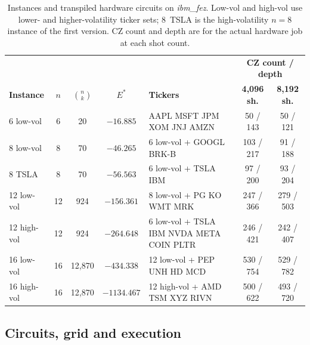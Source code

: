 \documentclass[conference]{IEEEtran}
\begin{document}
\begin{table}[t]
\caption{Instances and transpiled hardware circuits on \textit{ibm\_fez}.
Low-vol and high-vol use lower- and higher-volatility ticker sets; 8~TSLA
is the high-volatility $n{=}8$ instance of the first version. CZ count and
depth are for the actual hardware job at each shot count.}
\label{tab:instances}
\begin{center}
\begin{tabular}{@{}lccclcc@{}}
\toprule
& & & & & \multicolumn{2}{c}{\textbf{CZ count / depth}} \\
\textbf{Instance} & $n$ & $\binom{n}{k}$ & $E^*$ & \textbf{Tickers} & \textbf{4{,}096 sh.} & \textbf{8{,}192 sh.} \\
\midrule
6 low-vol   & 6  & 20       & $-16.885$   & AAPL MSFT JPM XOM JNJ AMZN            & 50 / 143  & 50 / 121 \\
8 low-vol   & 8  & 70       & $-46.265$   & 6 low-vol + GOOGL BRK-B               & 103 / 217 & 91 / 188 \\
8 TSLA      & 8  & 70       & $-56.563$   & 6 low-vol + TSLA IBM                  & 97 / 200  & 93 / 204 \\
12 low-vol  & 12 & 924      & $-156.361$  & 8 low-vol + PG KO WMT MRK             & 247 / 366 & 279 / 503 \\
12 high-vol & 12 & 924      & $-264.648$  & 6 low-vol + TSLA IBM NVDA META COIN PLTR & 246 / 421 & 242 / 407 \\
16 low-vol  & 16 & 12{,}870 & $-434.338$  & 12 low-vol + PEP UNH HD MCD           & 530 / 754 & 529 / 782 \\
16 high-vol & 16 & 12{,}870 & $-1134.467$ & 12 high-vol + AMD TSM XYZ RIVN        & 500 / 622 & 493 / 720 \\
\bottomrule
\end{tabular}
\end{center}
\end{table}

\subsection{Circuits, grid and execution}
\end{document}
